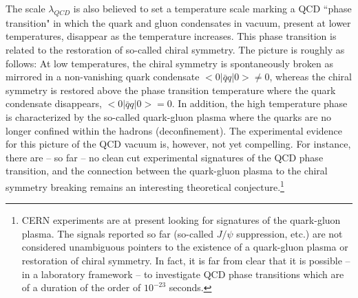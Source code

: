 \documentclass[12pt]{article}
\begin{document}
The scale $\lambda_{QCD}$ is also believed to set a temperature scale
marking a QCD ``phase transition" in which the quark and gluon
condensates in vacuum, present at lower temperatures, disappear as the
temperature increases. This phase transition is related to the
restoration of so-called chiral symmetry.  The picture is roughly as
follows: At low temperatures, the chiral symmetry is spontaneously
broken as mirrored in a non-vanishing quark condensate $<0 |\bar{q} q
| 0 > \neq 0$, whereas the chiral symmetry is restored above the phase
transition temperature where the quark condensate disappears, $< 0 |
\bar{q} q | 0 > = 0$. In addition, the high temperature phase is
characterized by the so-called quark-gluon plasma where the quarks are
no longer confined within the hadrons (deconfinement).
The experimental evidence for this picture of the QCD vacuum is,
however, not yet compelling.  For instance, there are -- so far -- no
clean cut experimental signatures of the QCD phase transition, and the
connection between the quark-gluon plasma to the chiral symmetry
breaking remains an interesting theoretical conjecture.\footnote{CERN
experiments are at present looking for signatures of the quark-gluon
plasma. The signals reported so far (so-called $J/\psi$ suppression,
etc.) are not considered unambiguous pointers to the existence of a
quark-gluon plasma or restoration of chiral symmetry. In fact, it is
far from clear that it is possible -- in a laboratory framework -- to
investigate QCD phase transitions which are of a duration of the order
of $10^{-23}$ seconds.}
\end{document}
